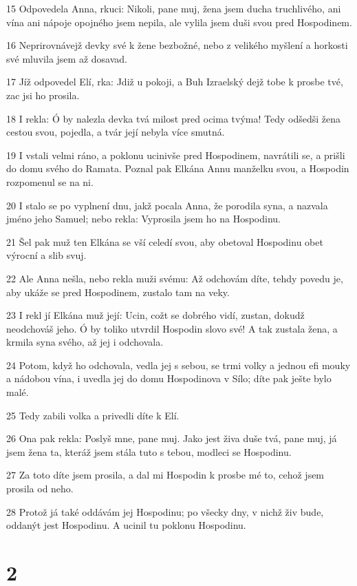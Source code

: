 \par 15 Odpovedela Anna, rkuci: Nikoli, pane muj, žena jsem ducha truchlivého, ani vína ani nápoje opojného jsem nepila, ale vylila jsem duši svou pred Hospodinem.
\par 16 Neprirovnávejž devky své k žene bezbožné, nebo z velikého myšlení a horkosti své mluvila jsem až dosavad.
\par 17 Jíž odpovedel Elí, rka: Jdiž u pokoji, a Buh Izraelský dejž tobe k prosbe tvé, zac jsi ho prosila.
\par 18 I rekla: Ó by nalezla devka tvá milost pred ocima tvýma! Tedy odšedši žena cestou svou, pojedla, a tvár její nebyla více smutná.
\par 19 I vstali velmi ráno, a poklonu ucinivše pred Hospodinem, navrátili se, a prišli do domu svého do Ramata. Poznal pak Elkána Annu manželku svou, a Hospodin rozpomenul se na ni.
\par 20 I stalo se po vyplnení dnu, jakž pocala Anna, že porodila syna, a nazvala jméno jeho Samuel; nebo rekla: Vyprosila jsem ho na Hospodinu.
\par 21 Šel pak muž ten Elkána se vší celedí svou, aby obetoval Hospodinu obet výrocní a slib svuj.
\par 22 Ale Anna nešla, nebo rekla muži svému: Až odchovám díte, tehdy povedu je, aby ukáže se pred Hospodinem, zustalo tam na veky.
\par 23 I rekl jí Elkána muž její: Ucin, cožt se dobrého vidí, zustan, dokudž neodchováš jeho. Ó by toliko utvrdil Hospodin slovo své! A tak zustala žena, a krmila syna svého, až jej i odchovala.
\par 24 Potom, když ho odchovala, vedla jej s sebou, se trmi volky a jednou efi mouky a nádobou vína, i uvedla jej do domu Hospodinova v Sílo; díte pak ješte bylo malé.
\par 25 Tedy zabili volka a privedli díte k Elí.
\par 26 Ona pak rekla: Poslyš mne, pane muj. Jako jest živa duše tvá, pane muj, já jsem žena ta, kteráž jsem stála tuto s tebou, modleci se Hospodinu.
\par 27 Za toto díte jsem prosila, a dal mi Hospodin k prosbe mé to, cehož jsem prosila od neho.
\par 28 Protož já také oddávám jej Hospodinu; po všecky dny, v nichž živ bude, oddanýt jest Hospodinu. A ucinil tu poklonu Hospodinu.

\chapter{2}

